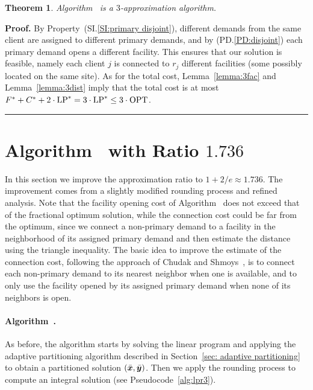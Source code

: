 \documentclass[oneside,final]{ucr}
\newtheorem{theorem}{Theorem}
\newenvironment{proof}[1][Proof]{\textbf{#1.} }{\ \rule{0.5em}{0.5em}}
\begin{document}

\begin{theorem}
Algorithm~{\EGUP} is a $3$-approximation algorithm.
\end{theorem}

\begin{proof}
  By Property~(SI.\ref{SI:primary disjoint}), different
  demands from the same client are assigned to different
  primary demands, and by (PD.\ref{PD:disjoint}) each primary
  demand opens a different facility. This ensures that our
  solution is feasible, namely each client $j$ is connected
  to $r_j$ different facilities (some possibly located on
  the same site).  As for the total cost,
  Lemma~\ref{lemma:3fac} and Lemma~\ref{lemma:3dist} imply
  that the total cost is at most
  $F^\ast+C^\ast+2\cdot\mbox{\rm LP}^\ast = 3\cdot\mbox{\rm LP}^\ast \leq
  3\cdot\mbox{\rm OPT}$.
\end{proof}


\section{Algorithm~{\ECHS} with Ratio $1.736$}
\label{sec: 1.736-approximation}

In this section we improve the approximation ratio to $1+2/e \approx
1.736$. The improvement comes from a slightly modified rounding
process and refined analysis.  Note that the facility opening cost of
Algorithm~{\EGUP} does not exceed that of the fractional optimum
solution, while the connection cost could be far from the optimum,
since we connect a non-primary demand to a facility in the neighborhood of
its assigned primary demand and then estimate the distance using the
triangle inequality. The basic idea to improve the estimate of the connection cost,
following the approach of Chudak and Shmoys~\cite{ChudakS04}, 
is to connect each non-primary demand to its
nearest neighbor when one is available, and to only use the facility opened by
its assigned primary demand when none of its neighbors is open.


\paragraph{Algorithm~{\ECHS}.}
As before,
the algorithm starts by solving the linear program and applying the
adaptive partitioning algorithm  described in 
Section~\ref{sec: adaptive partitioning} to obtain a partitioned
solution $(\bar{\boldsymbol{x}}, \bar{\boldsymbol{y}})$. Then we apply the rounding
process to compute an integral solution (see Pseudocode~\ref{alg:lpr3}).  
\end{document}
